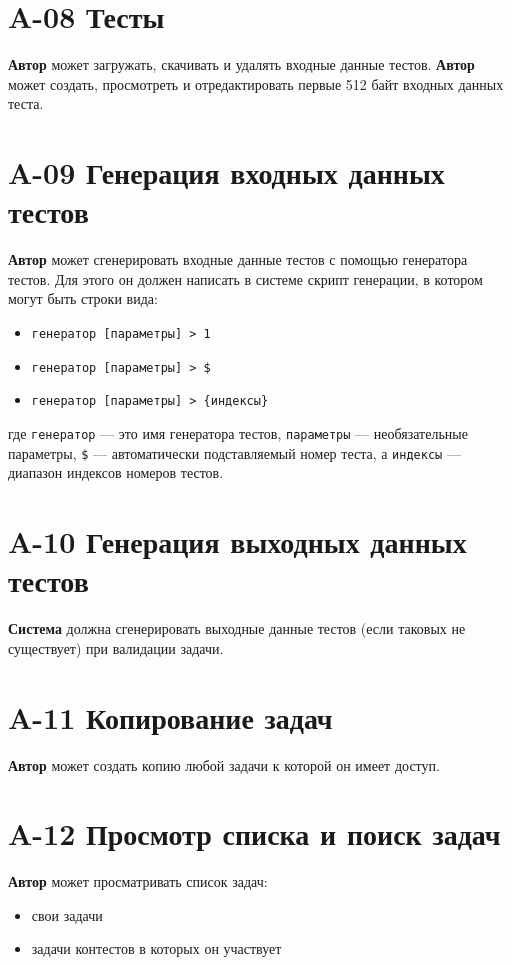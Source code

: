 \documentclass{book}
\begin{document}
\newpage \section*{A-08 Тесты}
\textbf{Автор} может загружать, скачивать и удалять входные данные тестов.
\textbf{Автор} может создать, просмотреть и отредактировать первые 512 байт входных данных теста.

\newpage \section*{A-09 Генерация входных данных тестов}
\textbf{Автор} может сгенерировать входные данные тестов с помощью генератора тестов.
Для этого он должен написать в системе скрипт генерации, в котором могут быть строки вида:
\begin{itemize}\setlength{\itemsep}{0pt}
	\item \texttt{генератор [параметры] > 1}
	\item \texttt{генератор [параметры] > \$}
	\item \texttt{генератор [параметры] > \{индексы\}}
\end{itemize}
где \texttt{генератор} — это имя генератора тестов, \texttt{параметры} — необязательные параметры, \texttt{\$} — автоматически подставляемый номер теста, а \texttt{индексы} — диапазон индексов номеров тестов.

\newpage \section*{A-10 Генерация выходных данных тестов}
\textbf{Система} должна сгенерировать выходные данные тестов (если таковых не существует) при валидации задачи.

\newpage \section*{A-11 Копирование задач}
\textbf{Автор} может создать копию любой задачи к которой он имеет доступ.

\newpage \section*{A-12 Просмотр списка и поиск задач}
\textbf{Автор} может просматривать список задач:
\begin{itemize}\setlength{\itemsep}{0pt}
	\item свои задачи
	\item задачи контестов в которых он участвует 
\end{itemize}
\end{document}
